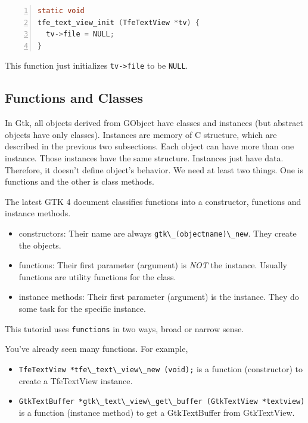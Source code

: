 \begin{lstlisting}[language=C, numbers=left]
static void
tfe_text_view_init (TfeTextView *tv) {
  tv->file = NULL;
}
\end{lstlisting}

This function just initializes \passthrough{\lstinline!tv->file!} to be
\passthrough{\lstinline!NULL!}.

\subsection{Functions and Classes}\label{functions-and-classes}

In Gtk, all objects derived from GObject have classes and instances (but
abstract objects have only classes). Instances are memory of C
structure, which are described in the previous two subsections. Each
object can have more than one instance. Those instances have the same
structure. Instances just have data. Therefore, it doesn't define
object's behavior. We need at least two things. One is functions and the
other is class methods.

The latest GTK 4 document classifies functions into a constructor,
functions and instance methods.

\begin{itemize}
\tightlist
\item
  constructors: Their name are always
  \passthrough{\lstinline!gtk\_(objectname)\_new!}. They create the
  objects.
\item
  functions: Their first parameter (argument) is \emph{NOT} the
  instance. Usually functions are utility functions for the class.
\item
  instance methods: Their first parameter (argument) is the instance.
  They do some task for the specific instance.
\end{itemize}

This tutorial uses \passthrough{\lstinline!functions!} in two ways,
broad or narrow sense.

You've already seen many functions. For example,

\begin{itemize}
\tightlist
\item
  \passthrough{\lstinline!TfeTextView *tfe\_text\_view\_new (void);!} is
  a function (constructor) to create a TfeTextView instance.
\item
  \passthrough{\lstinline!GtkTextBuffer *gtk\_text\_view\_get\_buffer (GtkTextView *textview)!}
  is a function (instance method) to get a GtkTextBuffer from
  GtkTextView.
\end{itemize}

